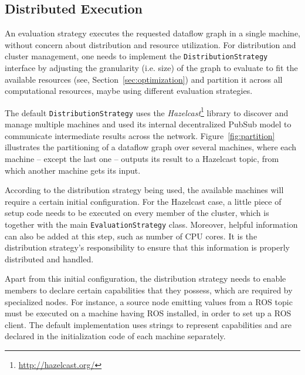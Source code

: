 \documentclass[sigplan,screen,review,anonymous]{acmart}
\begin{document}
\subsection{Distributed Execution} \label{sec:distributed}

An evaluation strategy executes the requested dataflow graph in a single
machine, without concern about distribution and resource utilization.
%
For distribution and cluster management, one needs to implement
the \texttt{DistributionStrategy} interface by adjusting the granularity (i.e. size) of
the graph to evaluate to fit the available resources (see, Section~\ref{sec:optimization})
and partition it across all computational resources, maybe using different evaluation strategies.

The default \texttt{DistributionStrategy} uses the \textit{Hazelcast}\footnote{\url{http://hazelcast.org/}}
library to discover and manage multiple machines and used its internal decentralized PubSub model
to communicate intermediate results across the network. Figure~\ref{fig:partition}
illustrates the partitioning of a dataflow graph over several machines, where each
machine -- except the last one -- outputs its result to a Hazelcast topic,
from which another machine gets its input.
%

According to the distribution strategy being used, the available machines will
require a certain initial configuration. For the Hazelcast case, a
little piece of setup code needs to be executed on every member of the cluster,
which is together with the main \texttt{EvaluationStrategy} class. Moreover, helpful
information can also be added at this step, such as number of CPU cores. It is
the distribution strategy's responsibility to ensure that this information is
properly distributed and handled.

Apart from this initial configuration, the distribution strategy needs to enable
members to declare certain capabilities that they possess, which are required by
specialized nodes. For instance, a source node emitting values from a ROS topic
must be executed on a machine having ROS installed, in order to set up a ROS
client. The default implementation uses strings to represent capabilities and
are declared in the initialization code of each machine separately.
\end{document}
